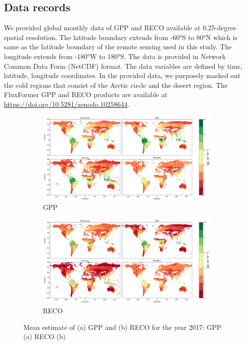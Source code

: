 \subsection{Data records}
We provided global monthly data of GPP and RECO available at 0.25-degree spatial resolution. The latitude boundary extends from -60°S to 80°N which is same as the latitude boundary of the remote sensing used in this study. The longitude extends from -180°W to 180°S. The data is provided in Network Common Data Form (NetCDF) format. The data variables are defined by time, latitude, longitude coordinates. In the provided data, we purposely masked out the cold regions that consist of the Arctic circle and the desert region. The FluxFormer GPP and RECO products are available at \url{https://doi.org/10.5281/zenodo.10258644}.\par
\begin{figure}[tbh!]
    \centering
    \begin{subfigure}{\textwidth}
      \centering
      \includegraphics[width=\textwidth]{figs/chap6/GPP_2017_mean.png}
      \caption{GPP}
      \label{fig:chap6_fig2a}
    \end{subfigure}

    \begin{subfigure}{\textwidth}
      \centering
      \includegraphics[width=\textwidth]{figs/chap6/RECO_2017_mean.png}
      \caption{RECO}
      \label{fig:chap6_fig2b}
    \end{subfigure}
    \caption[Mean estimate of GPP and RECO in 2017]{Mean estimate of (a) GPP and (b) RECO for the year 2017: GPP (a) RECO (b)}
    \label{fig:chap6_fig2}
\end{figure}

